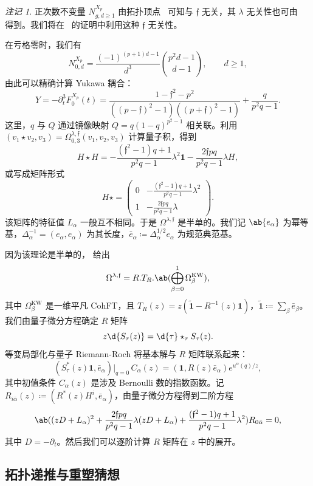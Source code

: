 \documentclass{amsart}
\theoremstyle{definition}
\theoremstyle{remark}
\newtheorem{rmk}[thm]{注记}
\theoremstyle{plain}
\theoremstyle{definition}
\theoremstyle{remark}
\newcommand{\mf}[1]{\mathfrak{#1}}
\newcommand{\mr}[1]{\mathrm{#1}}
\newcommand{\wt}[1]{\widetilde{#1}}
\newcommand{\1}{\mathbf{1}}
\newcommand{\2}{\mathbf{2}}
\newcommand{\3}{\mathbf{3}}
\begin{document}
\begin{rmk}
    正次数不变量 \(N^{X_p}_{g,d\geq1}\) 由拓扑顶点~\cite{LLLZ2009} 可知与 \(\mf{f}\) 无关，其 \(\lambda\) 无关性也可由~ 得到。我们将在~ 的证明中利用这种 \(\mf{f}\) 无关性。
\end{rmk}

在亏格零时，我们有
\[ N^{X_p}_{0,d} = \frac{(-1)^{(p+1)d-1}}{d^3}\binom{p^2d-1}{d-1}, \qquad d \geq 1, \]
由此可以精确计算 Yukawa 耦合：
\[ Y = -\partial_t^3 F_0^{X_p}(t) = \frac{1-\mf{f}^2-p^2}{((p-\mf{f})^2-1)((p+\mf{f})^2-1)} + \frac{q}{p^2q-1}. \]
这里，\(q\) 与 \(Q\) 通过镜像映射 \(Q = q(1-q)^{p^2-1}\) 相关联。利用 \((v_1 \star v_2, v_3) = \Omega^{\lambda,\mf{f}}_{0,3}(v_1,v_2,v_3)\) 计算量子积，得到
\[ H \star H = -\frac{(\mf{f}^2-1)q+1}{p^2q-1}\lambda^2 \1 - \frac{2\mf{f}pq}{p^2q-1}\lambda H, \]
或写成矩阵形式
\[ H \star = \begin{pmatrix} 0 & -\frac{(\mf{f}^2-1)q+1}{p^2q-1}\lambda^2 \\ 1 & -\frac{2\mf{f}pq}{p^2q-1}\lambda \end{pmatrix}. \]
该矩阵的特征值 \(L_{\alpha}\) 一般互不相同。于是 \(\Omega^{\lambda,\mf{f}}\) 是半单的。我们记 \(\ab\{e_{\alpha}\}\) 为幂等基，\(\Delta_{\alpha}^{-1} = (e_{\alpha},e_{\alpha})\) 为其长度，\(\bar{e}_{\alpha} \coloneqq \Delta_{\alpha}^{1/2}e_{\alpha}\) 为规范典范基。

因为该理论是半单的， 给出
\[ \Omega^{\lambda,\mf{f}} = R.T_R.\ab(\bigoplus_{\beta=0}^1 \Omega^{\mr{KW}}_{\beta}), \]
其中 \(\Omega^{\mr{KW}}_{\beta}\) 是一维平凡 CohFT，且 \(T_R(z) = z(\wt{\1}-R^{-1}(z)\1)\)，\(\wt{\1} \coloneqq \sum_{\beta}\bar{e}_{\beta}\)。我们由量子微分方程确定 \(R\) 矩阵
\[ z \d{S_{\tau}(z)} = \d{\tau} \star_{\tau} S_{\tau}(z). \]
等变局部化与量子 Riemann-Roch 将基本解与 \(R\) 矩阵联系起来：
\[ (S^*_{\tau}(z)\1, \bar{e}_{\alpha})\big|_{q=0}\, C_{\alpha}(z) = (\1, R(z)\bar{e}_{\alpha})e^{u^{\alpha}(q)/z}, \]
其中初值条件 \(C_{\alpha}(z)\) 是涉及 Bernoulli 数的指数函数。记 \(R_{i\bar{\alpha}}(z) \coloneqq (R^*(z)H^i, \bar{e}_{\alpha})\)，由量子微分方程得到二阶方程
\[ \ab( (zD+L_{\alpha})^2 + \frac{2\mf{f}pq}{p^2q-1}\lambda(zD+L_{\alpha}) + \frac{(\mf{f}^2-1)q+1}{p^2q-1}\lambda^2 )R_{0\bar{\alpha}} = 0, \]
其中 \(D = -\partial_t\)。然后我们可以逐阶计算 \(R\) 矩阵在 \(z\) 中的展开。

\subsection{拓扑递推与重塑猜想}%
\label{sub:Topological recursion and the remodeling conjecture}
\end{document}

